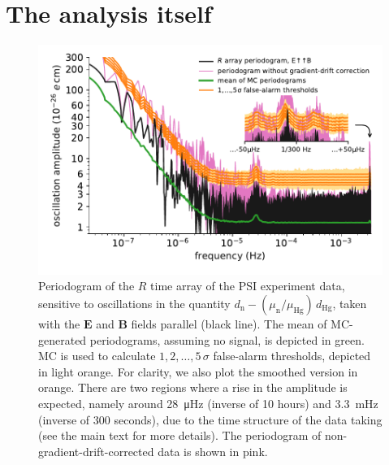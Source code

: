 






\section{The analysis itself}
\begin{figure}
  \centering
  \includegraphics[width=0.9\linewidth]{gfx/axions/detection_psi_inset_gc.pdf}
  \caption{Periodogram of the $R$ time array of the PSI experiment data, sensitive to oscillations in the quantity $d_\mathrm{n} - \left( \mu_\mathrm{n} / \mu_\mathrm{Hg} \right) \, d_\mathrm{Hg}$, taken with the $\boldsymbol{E}$ and $\boldsymbol{B}$ fields parallel (black line).
  The mean of MC-generated periodograms, assuming no signal, is depicted in green. MC is used to calculate $1,2,…,5\,\sigma$ false-alarm thresholds, depicted in light orange.
  For clarity, we also plot the smoothed version in orange.
  There are two regions where a rise in the amplitude is expected, namely around \SI{28}{\micro\hertz} (inverse of 10 hours) and \SI{3.3}{\milli\hertz} (inverse of 300 seconds), due to the time structure of the data taking (see the main text for more details). The periodogram of non-gradient-drift-corrected data is shown in pink.}\label{fig:axions_PSI_detection}
\end{figure}

